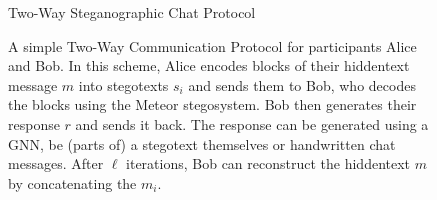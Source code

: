 \begin{figure}[htbp]
	\centering
	\begin{msc}[instance distance=4cm,action width=5cm]{Two-Way Steganographic Chat Protocol}
		\nextlevel[2]
		\nextlevel[3]
		\nextlevel[2]
		\nextlevel[3]
		\nextlevel
		\nextlevel[2]
		\nextlevel[3]
		\nextlevel
		\nextlevel[2]
		\nextlevel[3]
		\nextlevel
	\end{msc}
	\caption{
	A simple Two-Way Communication Protocol for participants Alice and Bob.
	In this scheme, Alice encodes blocks of their hiddentext message $m$ into stegotexts $s_i$ and sends them to Bob, who decodes the blocks using the Meteor stegosystem.
	Bob then generates their response $r$ and sends it back.
	The response can be generated using a GNN, be (parts of) a stegotext themselves or handwritten chat messages.
	After $\ell$ iterations, Bob can reconstruct the hiddentext $m$ by concatenating the $m_i$.
	}
	\label{fig:twowaycommunication}
\end{figure}

